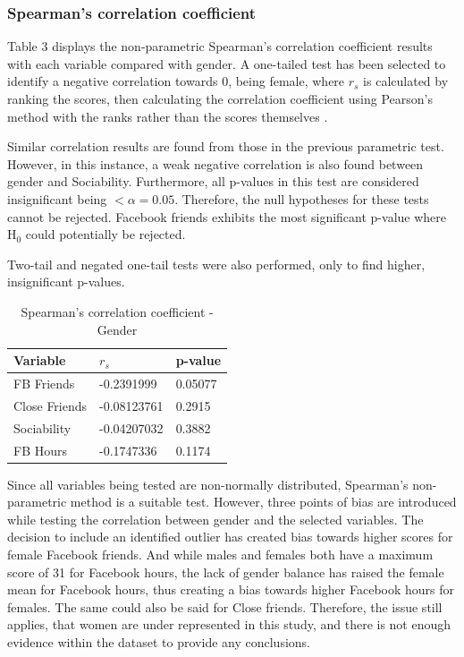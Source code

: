 \newpage
\subsubsection{Spearman's correlation coefficient}

Table 3 displays the non-parametric Spearman's correlation coefficient results with each variable compared with gender. A one-tailed test has been selected to identify a negative correlation towards 0, being female, where $r_s$ is calculated by ranking the scores, then calculating the correlation coefficient using Pearson's method with the ranks rather than the scores themselves \citep{McKillup2011}.

Similar correlation results are found from those in the previous parametric test. However, in this instance, a weak negative correlation is also found between gender and Sociability. Furthermore, all p-values in this test are considered insignificant being $< \alpha = 0.05$. Therefore, the null hypotheses for these tests cannot be rejected. Facebook friends exhibits the most significant p-value where H$_0$ could potentially be rejected.

Two-tail and negated one-tail tests were also performed, only to find higher, insignificant p-values.

\begin{table}[H]
\centering
\caption{Spearman's correlation coefficient - Gender}
\begin{tabular}{l|l|l}
Variable      & $r_s$      & p-value \\ \hline
FB Friends    & -0.2391999  & 0.05077 \\ \hline
Close Friends & -0.08123761 & 0.2915  \\ \hline
Sociability   & -0.04207032 & 0.3882  \\ \hline
FB Hours      & -0.1747336  & 0.1174  \\ \hline
\end{tabular}
\end{table}

Since all variables being tested are non-normally distributed, Spearman's non-parametric method is a suitable test. However, three points of bias are introduced while testing the correlation between gender and the selected variables. The decision to include an identified outlier has created bias towards higher scores for female Facebook friends. And while males and females both have a maximum score of 31 for Facebook hours, the lack of gender balance has raised the female mean for Facebook hours, thus creating a bias towards higher Facebook hours for females. The same could also be said for Close friends. Therefore, the issue still applies, that women are under represented in this study, and there is not enough evidence within the dataset to provide any conclusions.

